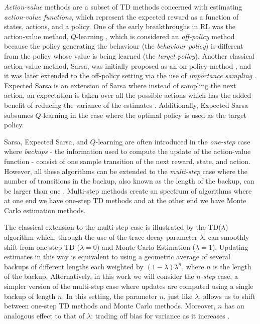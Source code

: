 \textit{Action-value} methods are a subset of TD methods concerned with estimating \textit{action-value functions}, which represent the expected reward as a function of states, actions, and a policy.
One of the early breakthroughs in RL was the action-value method, $Q$-learning \parencite{watkins1989qlearn,watkins1992}, which is considered an \textit{off-policy} method because the policy generating the behaviour (the \textit{behaviour policy}) is different from the policy whose value is being learned (the \textit{target policy}).
Another classical action-value method, Sarsa, was initially proposed as an on-policy method \parencite{rummery1995,sutton1996}, and it was later extended to the off-policy setting via the use of \textit{importance sampling} \parencite{precup2000}. 
Expected Sarsa is an extension of Sarsa where instead of sampling the next action, an expectation is taken over all the possible actions which has the added benefit of reducing the variance of the estimates \parencite{harm-hado-expected-sarsa}.
Additionally, Expected Sarsa subsumes $Q$-learning in the case where the optimal policy is used as the target policy.

Sarsa, Expected Sarsa, and $Q$-learning are often introduced in the \textit{one-step} case where \textit{backups} - the information used to compute the update of the action-value function 
- consist of one sample transition of the next reward, state, and action.
However, all these algorithms can be extended to the \textit{multi-step} case where the number of transitions in the backup, also known as the length of the backup, can be larger than one \parencite{rummery1995,precup2000,watkins1992}.
Multi-step methods create an spectrum of algorithms where at one end we have one-step TD methods and at the other end we have Monte Carlo estimation methods.

The classical extension to the multi-step case is illustrated by the TD($\lambda$) algorithm which, through the use of the trace decay parameter $\lambda$, can smoothly shift from one-step TD ($\lambda = 0$) and Monte Carlo Estimation ($\lambda = 1$). 
Updating estimates in this way is equivalent to using a geometric average of several backups of different lengths each weighted by $(1-\lambda) \lambda^n$, where $n$ is the length of the backup.
Alternatively, in this work we will consider the $n$\textit{-step} case, a simpler version of the multi-step case where updates are computed using a single backup of length $n$.
In this setting, the parameter $n$, just like $\lambda$, allows us to shift between one-step TD methods and Monte Carlo methods.
Moreover, $n$ has an analogous effect to that of $\lambda$: trading off bias for variance as it increases 
\parencite{Kearns:2000:BEB:648299.755183}.

